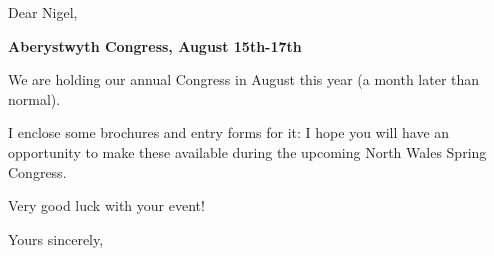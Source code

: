 \documentclass[12pt]{letter}
\begin{document}
\begin{letter}{}
\opening{Dear Nigel,}

{\bf Aberystwyth Congress, August 15th-17th}

We are holding our annual Congress in August this year (a month later
than normal).

I enclose some brochures and entry forms for it: I hope you will have
an opportunity to make these available during the upcoming
North Wales Spring Congress.

Very good luck with your event!

\closing{Yours sincerely,}


\end{letter}
\end{document}

